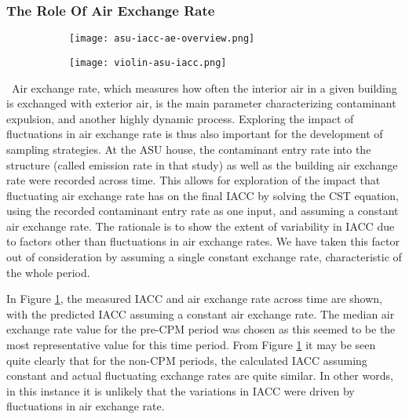 \documentclass[journal=esthag,manuscript=article]{achemso}
\begin{document}
\subsubsection{The Role Of Air Exchange Rate}
\begin{figure}[htb!]
  \caption{Comparison between the recorded  and the calculated TCE in indoor air at the ASU house, assuming constant air exchange rate. \ref{fig:asu-iacc-ae-overview} shows the TCE in indoor air across time as well as the exchange rate. \ref{fig:violin-iacc-aet} shows the distribution of these values for three periods.}
  \label{fig:ae-analysis}
  \begin{subfigure}{\textwidth}
    \caption{ }
    \label{fig:asu-iacc-ae-overview}
    \texttt{[image: asu-iacc-ae-overview.png]}
  \end{subfigure}
  \begin{subfigure}{0.75\textwidth}
    \caption{ }
    \label{fig:violin-iacc-aet}
    \texttt{[image: violin-asu-iacc.png]}
  \end{subfigure}
\end{figure}\
Air exchange rate, which measures how often the interior air in a given building is exchanged with exterior air, is the main parameter characterizing contaminant expulsion, and another highly dynamic process.
Exploring the impact of fluctuations in air exchange rate is thus also important for the development of sampling strategies.
At the ASU house, the contaminant entry rate into the structure (called emission rate in that study) as well as the building air exchange rate were recorded across time.
This allows for exploration of the impact that fluctuating air exchange rate has on the final IACC by solving the CST equation, using the recorded contaminant entry rate as one input, and assuming a constant air exchange rate.
The rationale is to show the extent of variability in IACC due to factors other than fluctuations in air exchange rates.
We have taken this factor out of consideration by assuming a single constant exchange rate, characteristic of the whole period.

In Figure \ref{fig:asu-iacc-ae-overview}, the measured IACC and air exchange rate across time are shown, with the predicted IACC assuming a constant air exchange rate.
The median air exchange rate value for the pre-CPM period was chosen as this seemed to be the most representative value for this time period.
From Figure \ref{fig:asu-iacc-ae-overview} it may be seen quite clearly that for the non-CPM periods, the calculated IACC assuming constant and actual fluctuating exchange rates are quite similar.
In other words, in this instance it is unlikely that the variations in IACC were driven by fluctuations in air exchange rate.
\end{document}
